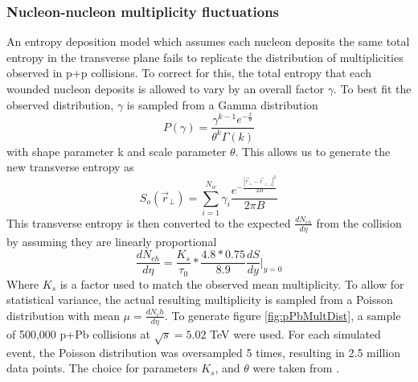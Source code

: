 \documentclass[preprint,showpacs,amsfonts,aps,prl,nofootinbib,floatfix]{revtex4}
\begin{document}
\subsubsection{Nucleon-nucleon multiplicity fluctuations}
\label{sec2a2}

An entropy deposition model which assumes each nucleon deposits the same total entropy in the transverse plane fails to replicate the distribution of multiplicities observed in p+p collisions. To correct for this, the total entropy that each wounded nucleon deposits is allowed to vary by an overall factor $\gamma$. To best fit the observed distribution, $\gamma$ is sampled from a Gamma distribution
\begin{equation} 
	P(\gamma) = \frac{\gamma^{k-1} e^{-\frac{x}{\theta}}}{\theta^k \Gamma(k)}
\end{equation}
with shape parameter k and scale parameter $\theta$. This allows us to generate the new transverse entropy as
\begin{equation} 
	S_{o}(\vec{r}_{\perp}) = \sum\limits_{i=1}^{N_{w}} \gamma_{i} \frac{e^{-\frac{|\vec{r}_{\perp}-\vec{r}_{\perp,i}|^2}{2B}}}{2\pi B}
\end{equation}
This transverse entropy is then converted to the expected $\frac{dN_{ch}}{d\eta}$ from the collision by assuming they are linearly proportional
\begin{equation}
	\frac{dN_{ch}}{d\eta} = \frac{K_{s}}{\tau_0} * \frac{4.8*0.75}{8.9} \frac{dS}{dy}\biggr\rvert_{y=0} 
\end{equation}
Where $K_s$ is a factor used to match the observed mean multiplicity. To allow for statistical variance, the actual resulting multiplicity is sampled from a Poisson distribution with mean $\mu = \frac{dN_ch}{d\eta}$. To generate figure \ref{fig:pPbMultDist}, a sample of 500,000 p+Pb collisions at $\sqrt{s} = 5.02$ TeV were used. For each simulated event, the Poisson distribution was oversampled 5 times, resulting in 2.5 million data points. The choice for parameters $K_s$, and $\theta$ were taken from \cite{Shen:2014vra}.
\end{document}
